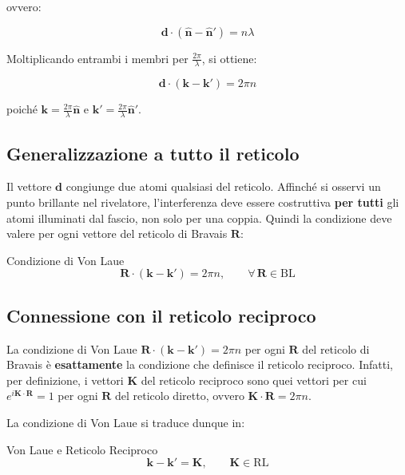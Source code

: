 ovvero:

$$\mathbf{d} \cdot (\hat{\mathbf{n}} - \hat{\mathbf{n}}') = n\lambda$$

Moltiplicando entrambi i membri per $\frac{2\pi}{\lambda}$, si ottiene:

$$\mathbf{d} \cdot (\mathbf{k} - \mathbf{k}') = 2\pi n$$

poiché $\mathbf{k} = \frac{2\pi}{\lambda}\hat{\mathbf{n}}$ e $\mathbf{k}' = \frac{2\pi}{\lambda}\hat{\mathbf{n}}'$.

\subsection*{Generalizzazione a tutto il reticolo}

Il vettore $\mathbf{d}$ congiunge due atomi qualsiasi del reticolo. Affinché si osservi un punto brillante nel rivelatore, l'interferenza deve essere costruttiva \textbf{per tutti} gli atomi illuminati dal fascio, non solo per una coppia. Quindi la condizione deve valere per ogni vettore del reticolo di Bravais $\mathbf{R}$:

\begin{equazione}{Condizione di Von Laue}
\begin{equation}
\mathbf{R} \cdot (\mathbf{k} - \mathbf{k}') = 2\pi n, \qquad \forall\, \mathbf{R} \in \text{BL}
\end{equation}
\end{equazione}




\subsection{Connessione con il reticolo reciproco}

La condizione di Von Laue $\mathbf{R} \cdot (\mathbf{k} - \mathbf{k}') = 2\pi n$ per ogni $\mathbf{R}$ del reticolo di Bravais è \textbf{esattamente} la condizione che definisce il reticolo reciproco. Infatti, per definizione, i vettori $\mathbf{K}$ del reticolo reciproco sono quei vettori per cui $e^{i\mathbf{K}\cdot\mathbf{R}} = 1$ per ogni $\mathbf{R}$ del reticolo diretto, ovvero $\mathbf{K} \cdot \mathbf{R} = 2\pi n$.

La condizione di Von Laue si traduce dunque in:

\begin{equazione}{Von Laue e Reticolo Reciproco}
\begin{equation}
\mathbf{k} - \mathbf{k}' = \mathbf{K}, \qquad \mathbf{K} \in \text{RL}
\end{equation}
\end{equazione}

